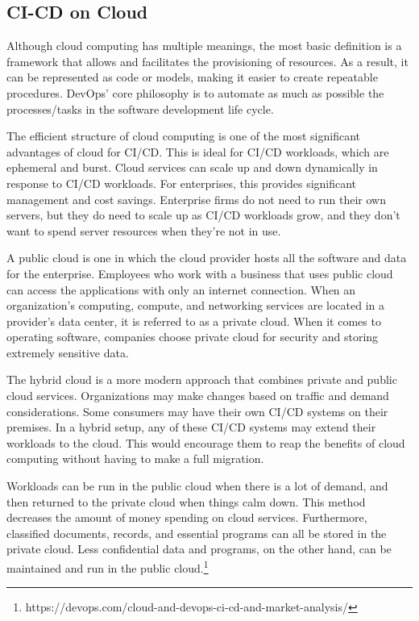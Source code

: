 %
\subsection{CI-CD on Cloud}
%
Although cloud computing has multiple meanings, the most basic definition is a framework that allows and facilitates the provisioning of resources. As a result, it can be represented as code or models, making it easier to create repeatable procedures. DevOps' core philosophy is to automate as much as possible the processes/tasks in the software development life cycle. 

The efficient structure of cloud computing is one of the most significant advantages of cloud for CI/CD. This is ideal for CI/CD workloads, which are ephemeral and burst. Cloud services can scale up and down dynamically in response to CI/CD workloads. For enterprises, this provides significant management and cost savings. Enterprise firms do not need to run their own servers, but they do need to scale up as CI/CD workloads grow, and they don't want to spend server resources when they're not in use.

A public cloud is one in which the cloud provider hosts all the software and data for the enterprise. Employees who work with a business that uses public cloud can access the applications with only an internet connection. When an organization's computing, compute, and networking services are located in a provider's data center, it is referred to as a private cloud. When it comes to operating software, companies choose private cloud for security and storing extremely sensitive data. 

The hybrid cloud is a more modern approach that combines private and public cloud services. Organizations may make changes based on traffic and demand considerations. Some consumers may have their own CI/CD systems on their premises. In a hybrid setup, any of these CI/CD systems may extend their workloads to the cloud. This would encourage them to reap the benefits of cloud computing without having to make a full migration.

Workloads can be run in the public cloud when there is a lot of demand, and then returned to the private cloud when things calm down. This method decreases the amount of money spending on cloud services. Furthermore, classified documents, records, and essential programs can all be stored in the private cloud. Less confidential data and programs, on the other hand, can be maintained and run in the public cloud.\footnote{https://devops.com/cloud-and-devops-ci-cd-and-market-analysis/}
%
